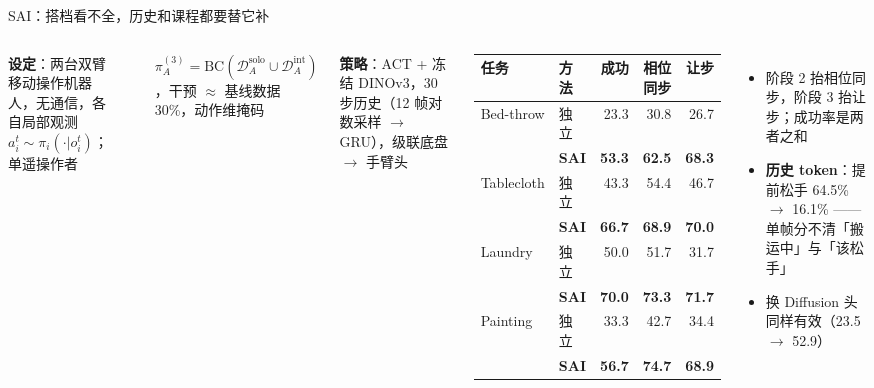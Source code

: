 \documentclass[aspectratio=169,10pt]{beamer}
\newcommand{\HL}[1]{\textcolor{emphasis}{\textbf{#1}}}
\begin{document}
\begin{frame}{SAI：搭档看不全，历史和课程都要替它补}
\begin{columns}[T]
\textbf{设定}：两台双臂移动操作机器人，无通信，各自局部观测 $a_i^t\sim\pi_i(\cdot|o_i^t)$；单遥操作者
\vspace{4pt}
\begin{center}
\end{center}
$\pi_A^{(3)}=\mathrm{BC}(\mathcal D_A^{\text{solo}}\cup\mathcal D_A^{\text{int}})$，干预 $\approx$ 基线数据 30\%，动作维掩码

\vspace{2pt}
\textbf{策略}：ACT + 冻结 DINOv3，30 步历史（12 帧对数采样 $\to$ GRU），级联底盘 $\to$ 手臂头
\begin{center}
\small
\begin{tabular}{@{}llrrr@{}}
\toprule
任务 & 方法 & 成功 & 相位同步 & 让步 \\
\midrule
Bed-throw & 独立 & 23.3 & 30.8 & 26.7 \\
 & \textbf{SAI} & \textbf{53.3} & \textbf{62.5} & \textbf{68.3} \\
Tablecloth & 独立 & 43.3 & 54.4 & 46.7 \\
 & \textbf{SAI} & \textbf{66.7} & \textbf{68.9} & \textbf{70.0} \\
Laundry & 独立 & 50.0 & 51.7 & 31.7 \\
 & \textbf{SAI} & \textbf{70.0} & \textbf{73.3} & \textbf{71.7} \\
Painting & 独立 & 33.3 & 42.7 & 34.4 \\
 & \textbf{SAI} & \textbf{56.7} & \textbf{74.7} & \textbf{68.9} \\
\bottomrule
\end{tabular}
\end{center}
\begin{itemize}
\item 阶段 2 抬相位同步，阶段 3 抬让步；成功率是两者之和
\item \HL{历史 token}：提前松手 64.5\% $\to$ 16.1\% —— 单帧分不清「搬运中」与「该松手」
\item 换 Diffusion 头同样有效（23.5 $\to$ 52.9）
\end{itemize}
\end{columns}
\end{frame}
\end{document}
